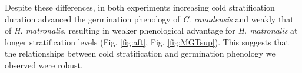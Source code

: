 \documentclass{article}[11pt]
\begin{document}
Despite these differences, in both experiments increasing cold stratification duration advanced the germination phenology of \textit{C. canadensis} and weakly that of \textit{H. matronalis}, resulting in weaker phenological advantage for \textit{H. matronalis} at longer stratification levels (Fig. \ref{fig:aft}, Fig.  \ref{fig:MGTsup}). This suggests that the relationships between cold stratification and germination phenology we observed were robust. 
\end{document}
